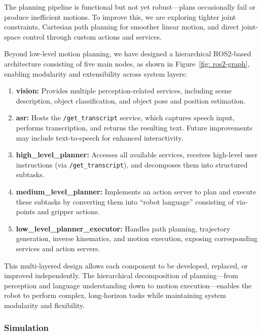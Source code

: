 \documentclass[12pt]{extarticle}
\begin{document}
The planning pipeline is functional but not yet robust—plans occasionally fail or produce inefficient motions. To improve this, we are exploring tighter joint constraints, Cartesian path planning for smoother linear motion, and direct joint-space control through custom actions and services.

Beyond low-level motion planning, we have designed a hierarchical ROS2-based architecture consisting of five main nodes, as shown in Figure~\ref{fig: ros2-graph}, enabling modularity and extensibility across system layers:
\begin{enumerate}
    \item \textbf{vision:} Provides multiple perception-related services, including scene description, object classification, and object pose and position estimation.
    \item \textbf{asr:} Hosts the \texttt{/get\_transcript} service, which captures speech input, performs transcription, and returns the resulting text. Future improvements may include text-to-speech for enhanced interactivity.
    \item \textbf{high\_level\_planner:} Accesses all available services, receives high-level user instructions (via \texttt{/get\_transcript}), and decomposes them into structured subtasks.
    \item \textbf{medium\_level\_planner:} Implements an action server to plan and execute these subtasks by converting them into “robot language” consisting of via-points and gripper actions.
    \item \textbf{low\_level\_planner\_executor:} Handles path planning, trajectory generation, inverse kinematics, and motion execution, exposing corresponding services and action servers.
\end{enumerate}

This multi-layered design allows each component to be developed, replaced, or improved independently. The hierarchical decomposition of planning—from perception and language understanding down to motion execution—enables the robot to perform complex, long-horizon tasks while maintaining system modularity and flexibility.



\subsubsection{Simulation}
\end{document}
